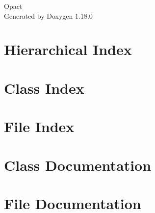 \documentclass[twoside]{book}
\newcommand{\+}{\discretionary{\mbox{\scriptsize$\hookleftarrow$}}{}{}}
\newcommand{\clearemptydoublepage}{%
    \newpage{\pagestyle{empty}\cleardoublepage}%
  }
\begin{document}
  \raggedbottom
    \hypersetup{pageanchor=false,
                bookmarksnumbered=true,
                pdfencoding=unicode
               }
  \begin{titlepage}
  \vspace*{7cm}
  \begin{center}%
  {\Large Opact}\\
  \vspace*{1cm}
  {\large Generated by Doxygen 1.18.0}\\
  \end{center}
  \end{titlepage}
  \clearemptydoublepage
  \tableofcontents
  \clearemptydoublepage
  \hypersetup{pageanchor=true}
\chapter{Hierarchical Index}

\chapter{Class Index}

\chapter{File Index}

\chapter{Class Documentation}



































\chapter{File Documentation}









  \backmatter
  \newpage
  \clearemptydoublepage
  \printindex
\end{document}

